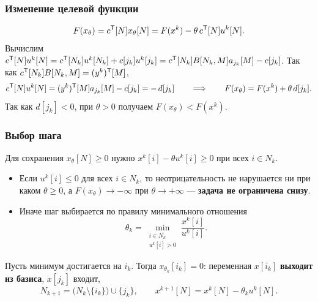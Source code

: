 \subsubsection*{Изменение целевой функции}

\[
  F(x_\theta) = c^{\mathsf{T}}[N]x_\theta[N] = F(x^k) - \theta\,c^{\mathsf{T}}[N]u^k[N] .
\]
Вычислим $c^{\mathsf{T}}[N]u^k[N] = c^{\mathsf{T}}[N_k]u^k[N_k] + c[j_k]u^k[j_k]
= c^{\mathsf{T}}[N_k]B[N_k,M]a_{j_k}[M] - c[j_k]$. Так как
$c^{\mathsf{T}}[N_k]B[N_k,M] = (y^k)^{\mathsf{T}}[M]$,
\[
  c^{\mathsf{T}}[N]u^k[N] = (y^k)^{\mathsf{T}}[M]a_{j_k}[M] - c[j_k] = -\,d[j_k]
  \qquad\Longrightarrow\qquad
  F(x_\theta) = F(x^k) + \theta\, d[j_k] .
\]
Так как $d[j_k] < 0$, при $\theta > 0$ получаем $F(x_\theta) < F(x^k)$.

\subsubsection*{Выбор шага}

Для сохранения $x_\theta[N] \ge 0$ нужно $x^k[i] - \theta u^k[i] \ge 0$ при всех
$i \in N_k$.
\begin{itemize}[nosep,left=0pt]
  \item Если $u^k[i] \le 0$ для всех $i \in N_k$, то неотрицательность не
        нарушается ни при каком $\theta \ge 0$, а $F(x_\theta) \to -\infty$ при
        $\theta \to +\infty$ — \textbf{задача не ограничена снизу}.
  \item Иначе шаг выбирается по правилу минимального отношения
        \[
          \theta_k = \min_{\substack{i \in N_k \\ u^k[i] > 0}}
                     \frac{x^k[i]}{u^k[i]} .
        \]
\end{itemize}
Пусть минимум достигается на $i_k$. Тогда $x_{\theta_k}[i_k] = 0$: переменная
$x[i_k]$ \textbf{выходит из базиса}, $x[j_k]$ входит,
\[
  N_{k+1} = \big(N_k \setminus \{i_k\}\big) \cup \{j_k\} ,
  \qquad
  x^{k+1}[N] = x^k[N] - \theta_k u^k[N] .
\]

